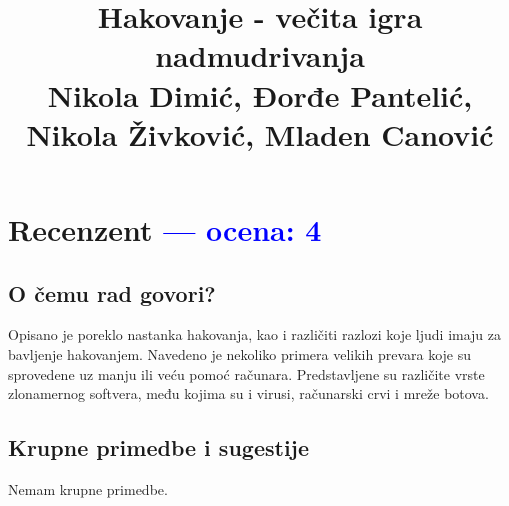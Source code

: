 \documentclass[a4paper]{report}
\newcommand{\odgovor}[1]{\textcolor{blue}{#1}}
\begin{document}
\title{Hakovanje - večita igra nadmudrivanja\\ \small{Nikola Dimić, Đorđe Pantelić, Nikola Živković, Mladen Canović}}

\maketitle

\tableofcontents

\chapter{Recenzent \odgovor{--- ocena: 4} }


\section{O čemu rad govori?}
Opisano je poreklo nastanka hakovanja, kao i različiti razlozi koje ljudi imaju za bavljenje hakovanjem.
Navedeno je nekoliko primera velikih prevara koje su sprovedene uz manju ili veću pomoć računara.
Predstavljene su različite vrste zlonamernog softvera, među kojima su i virusi, računarski crvi i mreže botova.

\section{Krupne primedbe i sugestije}
Nemam krupne primedbe.
\end{document}
